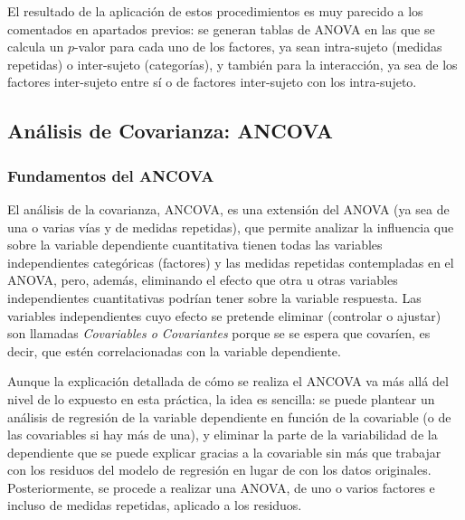 El resultado de la aplicación de estos procedimientos es muy parecido a los comentados en apartados previos: se generan tablas de ANOVA en
las que se calcula un $p$-valor para cada uno de los factores, ya sean intra-sujeto (medidas repetidas) o inter-sujeto (categorías), y
también para la interacción, ya sea de los factores inter-sujeto entre sí o de factores inter-sujeto con los intra-sujeto.


\subsection{Análisis de Covarianza: ANCOVA}

\subsubsection{Fundamentos del ANCOVA}
El análisis de la covarianza, ANCOVA, es una extensión del ANOVA (ya sea de una o varias vías y de medidas repetidas), que permite analizar
la influencia que sobre la variable dependiente cuantitativa tienen todas las variables independientes categóricas (factores) y las medidas
repetidas contempladas en el ANOVA, pero, además, eliminando el efecto que otra u otras variables independientes cuantitativas podrían tener
sobre la variable respuesta. Las variables independientes cuyo efecto se pretende eliminar (controlar o ajustar) son llamadas
\emph{Covariables o Covariantes} porque se se espera que covaríen, es decir, que estén correlacionadas con la variable dependiente.

Aunque la explicación detallada de cómo se realiza el ANCOVA va más allá del nivel de lo expuesto en esta práctica, la idea es sencilla: se
puede plantear un análisis de regresión de la variable dependiente en función de la covariable (o de las covariables si hay más de una), y
eliminar la parte de la variabilidad de la dependiente que se puede explicar gracias a la covariable sin más que trabajar con los residuos
del modelo de regresión en lugar de con los datos originales. Posteriormente, se procede a realizar una ANOVA, de uno o varios factores e
incluso de medidas repetidas, aplicado a los residuos.

